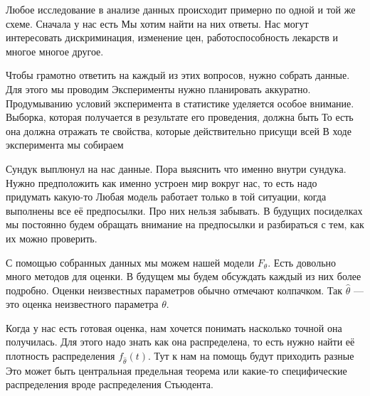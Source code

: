 \documentclass[12pt, a4paper, oneside]{article}
\begin{document}
Любое исследование в анализе данных происходит примерно по одной и той же схеме. Сначала у нас есть  Мы хотим найти на них ответы. Нас могут интересовать дискриминация, изменение цен, работоспособность лекарств и многое многое другое. 

Чтобы грамотно ответить на каждый из этих вопросов, нужно собрать данные. Для этого мы проводим  Эксперименты нужно планировать аккуратно. Продумыванию условий эксперимента в статистике уделяется особое внимание. Выборка, которая получается в результате его проведения, должна быть  То есть она должна отражать те свойства, которые действительно присущи всей  В ходе эксперимента мы собираем  

Сундук выплюнул на нас данные. Пора выяснить что именно внутри сундука. Нужно предположить как именно устроен мир вокруг нас, то есть надо придумать какую-то  Любая модель работает только в той ситуации, когда выполнены все её предпосылки. Про них нельзя забывать. В будущих посиделках мы постоянно будем обращать внимание на предпосылки и разбираться с тем, как их можно проверить. 

\begin{center}
\end{center}   	
    	
С помощью собранных данных мы можем  нашей модели $F_{\theta}$.	Есть довольно много методов для оценки. В будущем мы будем обсуждать каждый из них более подробно. Оценки неизвестных параметров обычно отмечают колпачком. Так $\hat{\theta}$ --- это оценка неизвестного параметра $\theta$. 

Когда у нас есть готовая оценка, нам хочется понимать насколько точной она получилась. Для этого надо знать как она распределена, то есть нужно найти её плотность распределения $f_{\hat \theta} (t)$. Тут к нам на помощь будут приходить разные  Это может быть центральная предельная теорема или какие-то специфические распределения вроде распределения Стьюдента.
\end{document}
